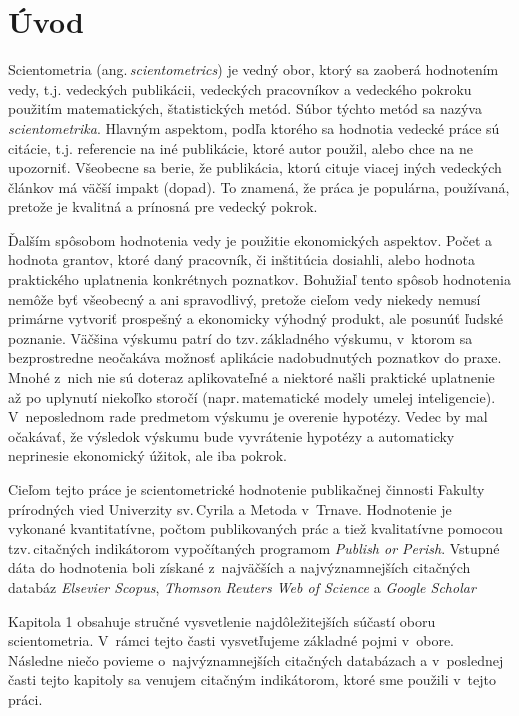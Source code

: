 \chapter*{Úvod}

Scientometria (ang.\,\emph{scientometrics}) je vedný obor, ktorý sa zaoberá
hodnotením vedy, t.j. vedeckých publikácii, vedeckých pracovníkov a vedeckého
pokroku použitím matematických, štatistických metód.  Súbor týchto metód sa
nazýva \emph{scientometrika}.  Hlavným aspektom, podľa ktorého sa hodnotia
vedecké práce sú citácie, t.j. referencie na iné publikácie, ktoré autor
použil, alebo chce na ne upozorniť.  Všeobecne sa berie, že publikácia, ktorú
cituje viacej iných vedeckých článkov má väčší impakt (dopad).  To znamená, že
práca je populárna, používaná, pretože je kvalitná a prínosná pre vedecký
pokrok.

Ďalším spôsobom hodnotenia vedy je použitie ekonomických aspektov.  Počet a
hodnota grantov, ktoré daný pracovník, či inštitúcia dosiahli, alebo hodnota
praktického uplatnenia konkrétnych poznatkov.  Bohužiaľ tento spôsob hodnotenia
nemôže byť všeobecný a ani spravodlivý, pretože cieľom vedy niekedy nemusí
primárne vytvoriť prospešný a ekonomicky výhodný produkt, ale posunúť ľudské
poznanie.  Väčšina výskumu patrí do tzv.\,základného výskumu, v~ktorom sa
bezprostredne neočakáva možnosť aplikácie nadobudnutých poznatkov do praxe.
Mnohé z~nich nie sú doteraz aplikovateľné a niektoré našli praktické uplatnenie
až po uplynutí niekoľko storočí (napr.\,matematické modely umelej inteligencie).
V~neposlednom rade predmetom výskumu je overenie hypotézy.  Vedec by mal
očakávať, že výsledok výskumu bude vyvrátenie hypotézy a automaticky neprinesie
ekonomický úžitok, ale iba pokrok.

Cieľom tejto práce je scientometrické hodnotenie publikačnej činnosti Fakulty
prírodných vied Univerzity sv.\,Cyrila a Metoda v~Trnave.  Hodnotenie je
vykonané kvantitatívne, počtom publikovaných prác a tiež kvalitatívne pomocou
tzv.\,citačných indikátorom vypočítaných programom \emph{Publish or Perish}.
Vstupné dáta do hodnotenia boli získané z~najväčších a najvýznamnejších
citačných databáz \emph{Elsevier Scopus}, \emph{Thomson Reuters Web of Science}
a \emph{Google Scholar}

Kapitola 1 obsahuje stručné vysvetlenie najdôležitejších súčastí oboru
 scientometria. V~rámci tejto časti vysvetľujeme základné pojmi v~obore.
Následne niečo povieme o~najvýznamnejších citačných databázach a v~poslednej
časti tejto kapitoly sa venujem citačným indikátorom, ktoré sme použili
v~tejto práci.

